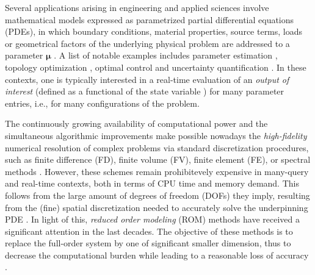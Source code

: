 \documentclass{elsarticle}
\theoremstyle{theorem}
\theoremstyle{definition}
\theoremstyle{remark}
\theoremstyle{proposition}
\numberwithin{figure}{section}
\newcommand{\bg}[1]{\boldsymbol{#1}}
\begin{document}
		Several applications arising in engineering and applied sciences involve mathematical models expressed as parametrized partial differential equations (PDEs), in which boundary conditions, material properties, source terms, loads or geometrical factors of the underlying physical problem are addressed to a parameter $\bg{\mu}$ \cite{Eft08, HSR16, JIR14}. A list of notable examples includes parameter estimation \cite{Bro93}, topology optimization \cite{Ben04}, optimal control \cite{LM67} and uncertainty quantification \cite{LeM10}. In these contexts, one is typically interested in a real-time evaluation of an \emph{output of interest} (defined as a functional of the state variable \cite{Dep08}) for many parameter entries, i.e., for many configurations of the problem.  
		
		The continuously growing availability of computational power and the simultaneous algorithmic improvements make possible nowadays the \emph{high-fidelity} numerical resolution of complex problems via standard discretization procedures, such as finite difference (FD), finite volume (FV), finite element (FE), or spectral methods \cite{QMN15}. However, these schemes remain prohibitevely expensive in many-query and real-time contexts, both in terms of CPU time and memory demand. This follows from the large amount of degrees of freedom (DOFs) they imply, resulting from the (fine) spatial discretization needed to accurately solve the underpinning PDE \cite{Ams10}. In light of this, \emph{reduced order modeling} (ROM) methods have received a significant attention in the last decades. The objective of these methods is to replace the full-order system by one of significant smaller dimension, thus to decrease the computational burden while leading to a reasonable loss of accuracy \cite{Chen17}. 
		
\end{document}
